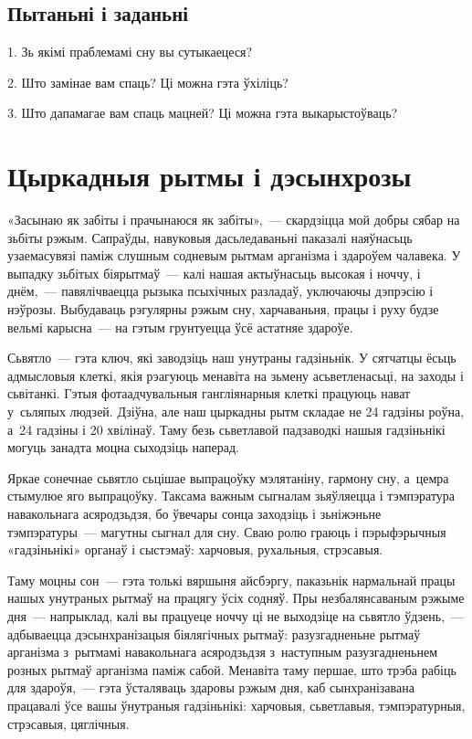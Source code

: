 \subsection*{Пытаньні і заданьні}

1. Зь якімі праблемамі сну вы сутыкаецеся?

2. Што замінае вам спаць? Ці можна гэта ўхіліць?

3. Што дапамагае вам спаць мацней? Ці можна гэта выкарыстоўваць?


\section{Цыркадныя рытмы і дэсынхрозы}

«Засынаю як забіты і прачынаюся як забіты»,~--- скардзіцца мой добры сябар на зьбіты рэжым. Сапраўды, навуковыя дасьледаваньні паказалі наяўнасьць узаемасувязі паміж слушным содневым рытмам арганізма і здароўем чалавека. У выпадку зьбітых біярытмаў~--- калі нашая актыўнасьць высокая і ноччу, і днём,~--- павялічваецца рызыка псыхічных разладаў, уключаючы дэпрэсію і нэўрозы. Выбудаваць рэгулярны рэжым сну, харчаваньня, працы і руху будзе вельмі карысна~--- на гэтым грунтуецца ўсё астатняе здароўе.

Сьвятло~--- гэта ключ, які заводзіць наш унутраны гадзіньнік. У сятчатцы ёсьць адмысловыя клеткі, якія рэагуюць менавіта на зьмену асьветленасьці, на заходы і сьвітанкі. Гэтыя фотаадчувальныя гангліянарныя клеткі працуюць нават у~сьляпых людзей. Дзіўна, але наш цыркадны рытм складае не 24 гадзіны роўна, а~24 гадзіны і 20 хвілінаў. Таму безь сьветлавой падзаводкі нашыя гадзіньнікі могуць занадта моцна сыходзіць наперад.

Яркае сонечнае сьвятло сьцішае выпрацоўку мэлятаніну, гармону сну, а~цемра стымулюе яго выпрацоўку. Таксама важным сыгналам зьяўляецца і тэмпэратура навакольнага асяродзьдзя, бо ўвечары сонца заходзіць і зьніжэньне тэмпэратуры~--- магутны сыгнал для сну. Сваю ролю граюць і пэрыфэрычныя «гадзіньнікі» органаў і сыстэмаў: харчовыя, рухальныя, стрэсавыя.

Таму моцны сон~--- гэта толькі вяршыня айсбэргу, паказьнік нармальнай працы нашых унутраных рытмаў на працягу ўсіх содняў. Пры незбалянсаваным рэжыме дня~--- напрыклад, калі вы працуеце ноччу ці не выходзіце на сьвятло ўдзень,~--- адбываецца дэсынхранізацыя біялягічных рытмаў: разузгадненьне рытмаў арганізма з~рытмамі навакольнага асяродзьдзя з~наступным разузгадненьнем розных рытмаў арганізма паміж сабой. Менавіта таму першае, што трэба рабіць для здароўя,~--- гэта ўсталяваць здаровы рэжым дня, каб сынхранізавана працавалі ўсе вашы ўнутраныя гадзіньнікі: харчовыя, сьветлавыя, тэмпэратурныя, стрэсавыя, цяглічныя.

